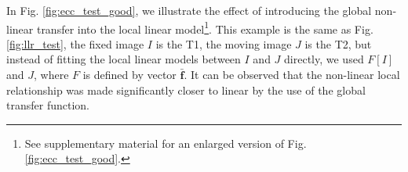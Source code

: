 In Fig. \ref{fig:ecc_test_good}, we illustrate the effect of introducing the global non-linear transfer into the local linear model\footnote{See supplementary material for an enlarged version of Fig. \ref{fig:ecc_test_good}.}. This example is the same as Fig. \ref{fig:llr_test}, the fixed image $I$ is the T1, the moving image $J$ is the T2, but instead of fitting the local linear models between $I$ and $J$ directly, we used $F[I]$ and $J$, where $F$ is defined by vector $\mathbf{\bar{f}}$. It can be observed that the non-linear local relationship was made significantly closer to linear by the use of the global transfer function.
\begin{figure}[t]
\centering

\end{figure}
